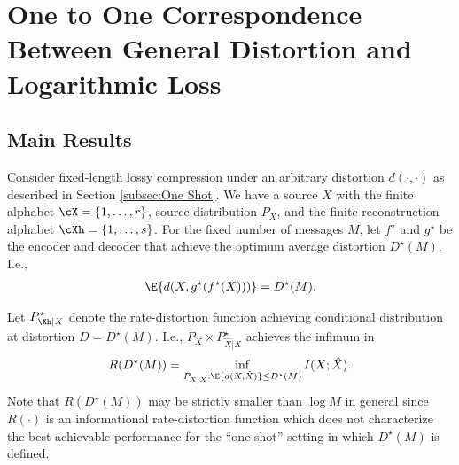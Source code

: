 \documentclass[draftclsnofoot, onecolumn, letterpaper, romanappendices]{IEEEtran}
\begin{document}
% 
%
%















\section{One to One Correspondence Between General Distortion and Logarithmic Loss}\label{sec:Equivalence}


\subsection{Main Results}

Consider fixed-length lossy compression under an arbitrary distortion $d(\cdot, \cdot)$
as described in Section \ref{subsec:One Shot}.
We have a source $X$ with the finite alphabet $\cX=\{1,\ldots,r\}$, source distribution $P_X$,
and the finite reconstruction alphabet $\cXh=\{1,\ldots, s\}$.
For the fixed number of messages $M$, let $f^\star$ and $g^\star$ be the encoder and decoder
that achieve the optimum average distortion $D^\star(M)$.
I.e.,
\begin{align*}
    \E{d(X, g^\star(f^\star(X)))} = D^\star(M).
\end{align*}

Let $P_{\Xh|X}^\star$ denote the rate-distortion function achieving conditional distribution at distortion $D=D^\star(M)$.
I.e., $P_X \times P_{\hat{X}|X}^\star$ achieves the infimum in
\begin{align}
    R(D^\star(M)) = \inf_{P_{\hat{X}|X}:\E{d(X,\hat{X})}\leq D^\star(M)} I(X;\hat{X}). \label{eq:RDstar}
\end{align}
Note that $R(D^\star(M))$ may be strictly smaller than $\log M$ in general
since $R(\cdot)$ is an informational rate-distortion function
which does not characterize the best achievable performance for the ``one-shot'' setting in which $D^\star(M)$ is defined.
\end{document}
